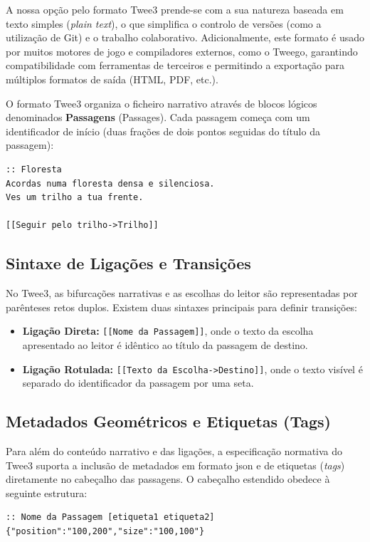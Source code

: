 A nossa opção pelo formato Twee3 prende-se com a sua natureza baseada em texto simples (\textit{plain text}), o que simplifica o controlo de versões (como a utilização de Git) e o trabalho colaborativo. Adicionalmente, este formato é usado por muitos motores de jogo e compiladores externos, como o Tweego, garantindo compatibilidade com ferramentas de terceiros e permitindo a exportação para múltiplos formatos de saída (HTML, PDF, etc.).

O formato Twee3 organiza o ficheiro narrativo através de blocos lógicos denominados \textbf{Passagens} (Passages). Cada passagem começa com um identificador de início (duas frações de dois pontos seguidas do título da passagem):

\begin{lstlisting}[language=HTML, caption={Estrutura básica de uma passagem em Twee3.}]
:: Floresta
Acordas numa floresta densa e silenciosa.
Ves um trilho a tua frente.

[[Seguir pelo trilho->Trilho]]
\end{lstlisting}
\subsection{Sintaxe de Ligações e Transições}
No Twee3, as bifurcações narrativas e as escolhas do leitor são representadas por parênteses retos duplos. Existem duas sintaxes principais para definir transições:
\begin{itemize}
    \item \textbf{Ligação Direta:} \lstinline|[[Nome da Passagem]]|, onde o texto da escolha apresentado ao leitor é idêntico ao título da passagem de destino.
    \item \textbf{Ligação Rotulada:} \lstinline|[[Texto da Escolha->Destino]]|, onde o texto visível é separado do identificador da passagem por uma seta.
\end{itemize}

\subsection{Metadados Geométricos e Etiquetas (Tags)}
\label{subsec:metadados-tags-twee}
Para além do conteúdo narrativo e das ligações, a especificação normativa do Twee3 suporta a inclusão de metadados em formato \gls{json} e de etiquetas (\textit{tags}) diretamente no cabeçalho das passagens. O cabeçalho estendido obedece à seguinte estrutura:
\begin{lstlisting}[caption={Exemplo de cabeçalho estendido com etiquetas e metadados geométricos em Twee3.}]
:: Nome da Passagem [etiqueta1 etiqueta2] {"position":"100,200","size":"100,100"}
\end{lstlisting}

